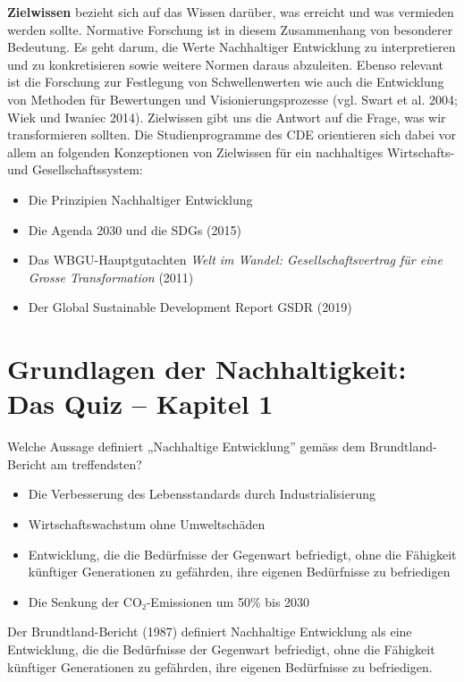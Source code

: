 \documentclass[
  nswissgerman,
  a4paper,
  DIV=11,
  numbers=noendperiod,
  oneside,
  openany]{scrreprt}
\providecommand{\tightlist}{%
  \setlength{\itemsep}{0pt}\setlength{\parskip}{0pt}}
\begin{document}
\textbf{Zielwissen} bezieht sich auf das Wissen darüber, was erreicht
und was vermieden werden sollte. Normative Forschung ist in diesem
Zusammenhang von besonderer Bedeutung. Es geht darum, die Werte
Nachhaltiger Entwicklung zu interpretieren und zu konkretisieren sowie
weitere Normen daraus abzuleiten. Ebenso relevant ist die Forschung zur
Festlegung von Schwellenwerten wie auch die Entwicklung von Methoden für
Bewertungen und Visionierungsprozesse (vgl. Swart et al. 2004; Wiek und
Iwaniec 2014). Zielwissen gibt uns die Antwort auf die Frage, was wir
transformieren sollten. Die Studienprogramme des CDE orientieren sich
dabei vor allem an folgenden Konzeptionen von Zielwissen für ein
nachhaltiges Wirtschafts- und Gesellschaftssystem:

\begin{itemize}
\tightlist
\item
  Die Prinzipien Nachhaltiger Entwicklung
\item
  Die Agenda 2030 und die SDGs (2015)
\item
  Das WBGU-Hauptgutachten \emph{Welt im Wandel: Gesellschaftsvertrag für
  eine Grosse Transformation} (2011)
\item
  Der Global Sustainable Development Report GSDR (2019)
\end{itemize}

\section{Grundlagen der Nachhaltigkeit: Das Quiz -- Kapitel
1}\label{grundlagen-der-nachhaltigkeit-das-quiz-kapitel-1}

Welche Aussage definiert „Nachhaltige Entwicklung'' gemäss dem
Brundtland-Bericht am treffendsten?

\begin{itemize}
\tightlist
\item[$\square$]
  Die Verbesserung des Lebensstandards durch Industrialisierung
\item[$\square$]
  Wirtschaftswachstum ohne Umweltschäden
\item[$\square$]
  Entwicklung, die die Bedürfnisse der Gegenwart befriedigt, ohne die
  Fähigkeit künftiger Generationen zu gefährden, ihre eigenen
  Bedürfnisse zu befriedigen
\item[$\square$]
  Die Senkung der CO₂-Emissionen um 50\% bis 2030
\end{itemize}

Der Brundtland-Bericht (1987) definiert Nachhaltige Entwicklung als eine
Entwicklung, die die Bedürfnisse der Gegenwart befriedigt, ohne die
Fähigkeit künftiger Generationen zu gefährden, ihre eigenen Bedürfnisse
zu befriedigen.
\end{document}
